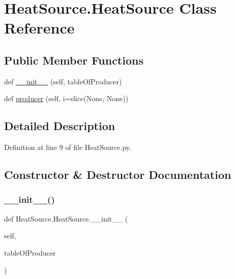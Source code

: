 \hypertarget{class_heat_source_1_1_heat_source}{}\section{Heat\+Source.\+Heat\+Source Class Reference}
\label{class_heat_source_1_1_heat_source}
\subsection*{Public Member Functions}
\begin{DoxyCompactItemize}
\item 
def \hyperlink{class_heat_source_1_1_heat_source_a0aa3ba858e7b64f2a0a3a27d91714097}{\+\_\+\+\_\+init\+\_\+\+\_\+} (self, table\+Of\+Producer)
\item 
def \hyperlink{class_heat_source_1_1_heat_source_a2c86ea2252b3a4f0eec9428fc61e14ab}{producer} (self, i=slice(None, None))
\end{DoxyCompactItemize}


\subsection{Detailed Description}


Definition at line 9 of file Heat\+Source.\+py.



\subsection{Constructor \& Destructor Documentation}
\mbox{\label{class_heat_source_1_1_heat_source_a0aa3ba858e7b64f2a0a3a27d91714097}} 
\subsubsection{\texorpdfstring{\+\_\+\+\_\+init\+\_\+\+\_\+()}{\_\_init\_\_()}}
{\footnotesize\ttfamily def Heat\+Source.\+Heat\+Source.\+\_\+\+\_\+init\+\_\+\+\_\+ (\begin{DoxyParamCaption}\item[{}]{self,  }\item[{}]{table\+Of\+Producer }\end{DoxyParamCaption})}



